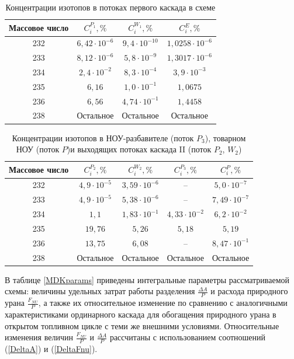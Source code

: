 \begin{table}[ht]
    \centering
    \caption{Концентрации изотопов в потоках первого каскада в схеме}\label{MDKcas1params}
    \begin{tabular}{|c|c|c|c|}
        \hline Массовое число & $C_{i}^{P_{1}}, \%$ & $C_{i}^{W_{1}}, \%$ & $C_{i}^{E}, \%$\\\hline 
        232 & $6,42\cdot10^{-6}$ & $9,4\cdot10^{-10}$ & $1,0258\cdot10^{-6}$\\
        233 & $8,12\cdot10^{-6}$ & $5,8\cdot10^{-9}$ & $1,3017\cdot10^{-6}$\\
        234 & $2,4\cdot10^{-2}$ & $8,3\cdot10^{-4}$ & $3,9\cdot10^{-3}$\\
        235 & $6,16$ & $1,0\cdot10^{-1}$ & $1,0675$\\
        236 & $6,56$ & $4,74\cdot10^{-1}$ & $1,4458$\\
        238 & Остальное & Остальное & Остальное\\
        \hline
    \end{tabular}
\end{table}

\begin{table}[ht]
    \centering
    \caption{Концентрации изотопов в НОУ-разбавителе (поток $P_{3}$), товарном НОУ (поток $P$)и выходящих потоках каскада II (поток $P_{2}$, $W_{2}$)}\label{MDKcas2params}
    \begin{tabular}{|c|c|c|c|c|}
        \hline Массовое число & $C_{i}^{P_{2}}, \%$ & $C_{i}^{W_{2}}, \%$ & $C_{i}^{P_{3}}, \%$ & $C_{i}^{P}, \%$\\
        \hline 232 & $4,9\cdot10^{-5}$ & $3,59\cdot10^{-6}$ & -- & $5,0\cdot10^{-7}$\\
        233 & $4,9\cdot10^{-5}$ & $5,38\cdot10^{-6}$ & -- & $7,49\cdot10^{-7}$\\
        234 & $1,1$ & $1,83\cdot10^{-1}$ & $4,33\cdot10^{-2}$ & $6,2\cdot10^{-2}$\\
        235 & $19,76$ & $5,26$ & $5,18$  & $5,19$\\
        236 & $13,75$ & $6,08$ & --  & $8,47\cdot10^{-1}$\\
        238 & Остальное & Остальное & Остальное  & Остальное\\
        \hline
\end{tabular}
\end{table}

В таблице \ref{MDKparams} приведены интегральные параметры рассматриваемой схемы: величины удельных затрат работы разделения $\frac{\Delta A}{P}$ и расхода природного урана $\frac{F_{NU}}{P}$, а также их относительное изменение по сравнению с аналогичными характеристиками ординарного каскада для обогащения природного урана в открытом топливном цикле с теми же внешними условиями. Относительные изменения величин $\frac{F_{NU}}{P}$ и $\frac{\Delta A}{P}$ рассчитаны с использованием соотношений (\ref{DeltaA}) и (\ref{DeltaFnu}).

